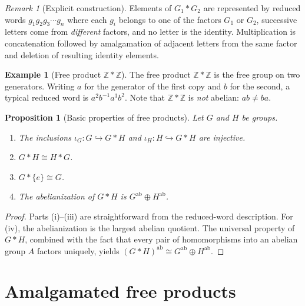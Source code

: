\documentclass[12pt,a4paper,openany]{book}
\theoremstyle{definition}
\newtheorem{example}[definition]{Example}
\theoremstyle{plain}
\newtheorem{proposition}[definition]{Proposition}
\theoremstyle{remark}
\newtheorem{remark}[definition]{Remark}
\newcommand{\Z}{\mathbb{Z}}
\begin{document}
\begin{remark}[Explicit construction]\label{rem:free-product-explicit}
  Elements of $G_1 * G_2$ are represented by reduced words
  $g_1 g_2 g_3 \cdots g_n$ where each $g_i$ belongs to one of the factors
  $G_1$ or $G_2$, successive letters come from \emph{different} factors, and no
  letter is the identity.  Multiplication is concatenation followed by
  amalgamation of adjacent letters from the same factor and deletion of
  resulting identity elements.
\end{remark}

\begin{example}[Free product $\Z * \Z$]\label{ex:Z-star-Z}
  The free product $\Z * \Z$ is the free group on two generators.  Writing
  $a$ for the generator of the first copy and $b$ for the second, a typical
  reduced word is $a^2 b^{-1} a^3 b^2$.  Note that $\Z * \Z$ is
  \emph{not} abelian: $ab \neq ba$.
\end{example}

\begin{proposition}[Basic properties of free products]\label{prop:free-product-props}
  Let $G$ and $H$ be groups.
  \begin{enumerate}[label=(\roman*)]
    \item The inclusions $\iota_G\colon G \hookrightarrow G * H$ and
      $\iota_H\colon H \hookrightarrow G * H$ are injective.
    \item $G * H \cong H * G$.
    \item $G * \{e\} \cong G$.
    \item The abelianization of $G*H$ is $G^{\mathrm{ab}} \oplus H^{\mathrm{ab}}$.
  \end{enumerate}
\end{proposition}

\begin{proof}
  Parts (i)--(iii) are straightforward from the reduced-word description.
  For (iv), the abelianization is the largest abelian quotient.  The universal
  property of $G*H$, combined with the fact that every pair of homomorphisms
  into an abelian group $A$ factors uniquely, yields
  $(G*H)^{\mathrm{ab}} \cong G^{\mathrm{ab}} \oplus H^{\mathrm{ab}}$.
\end{proof}

\section{Amalgamated free products}\label{sec:amalgamated}
\end{document}
